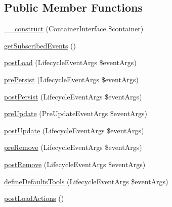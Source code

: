 \subsection*{Public Member Functions}
\begin{DoxyCompactItemize}
\item 
\hyperlink{class_acme_group_1_1services_1_1entities_services_1_1entity_listener_add71f7966467b964e7c9ec17b9815160}{\+\_\+\+\_\+construct} (Container\+Interface \$container)
\item 
\hyperlink{class_acme_group_1_1services_1_1entities_services_1_1entity_listener_af48f81ed30971c33110225c9f7698252}{get\+Subscribed\+Events} ()
\item 
\hyperlink{class_acme_group_1_1services_1_1entities_services_1_1entity_listener_a11f0b9bc3d0b6772b21348741430edfe}{post\+Load} (Lifecycle\+Event\+Args \$event\+Args)
\item 
\hyperlink{class_acme_group_1_1services_1_1entities_services_1_1entity_listener_a2345ed964671fe673c2bdfc585c9e2d7}{pre\+Persist} (Lifecycle\+Event\+Args \$event\+Args)
\item 
\hyperlink{class_acme_group_1_1services_1_1entities_services_1_1entity_listener_a053972cff9bb7ad9c2eddb274e162b4e}{post\+Persist} (Lifecycle\+Event\+Args \$event\+Args)
\item 
\hyperlink{class_acme_group_1_1services_1_1entities_services_1_1entity_listener_a84d99dad4f483b6befe3ba4bace03505}{pre\+Update} (Pre\+Update\+Event\+Args \$event\+Args)
\item 
\hyperlink{class_acme_group_1_1services_1_1entities_services_1_1entity_listener_a121d9ae77236310a03e5a44bb7f7e8cb}{post\+Update} (Lifecycle\+Event\+Args \$event\+Args)
\item 
\hyperlink{class_acme_group_1_1services_1_1entities_services_1_1entity_listener_ab656d8142269bb07b993d543010c2a8b}{pre\+Remove} (Lifecycle\+Event\+Args \$event\+Args)
\item 
\hyperlink{class_acme_group_1_1services_1_1entities_services_1_1entity_listener_a9746b0cce256fac88ee42a2b3b417b81}{post\+Remove} (Lifecycle\+Event\+Args \$event\+Args)
\item 
\hyperlink{class_acme_group_1_1services_1_1entities_services_1_1entity_listener_a9ee0e8c29f75527800eb1d7de071ae8e}{define\+Defaults\+Tools} (Lifecycle\+Event\+Args \$event\+Args)
\item 
\hyperlink{class_acme_group_1_1services_1_1entities_services_1_1entity_listener_a3bf2d38989b4b3fd8b2316e576a008e5}{post\+Load\+Actions} ()
\item 

\end{DoxyCompactItemize}
